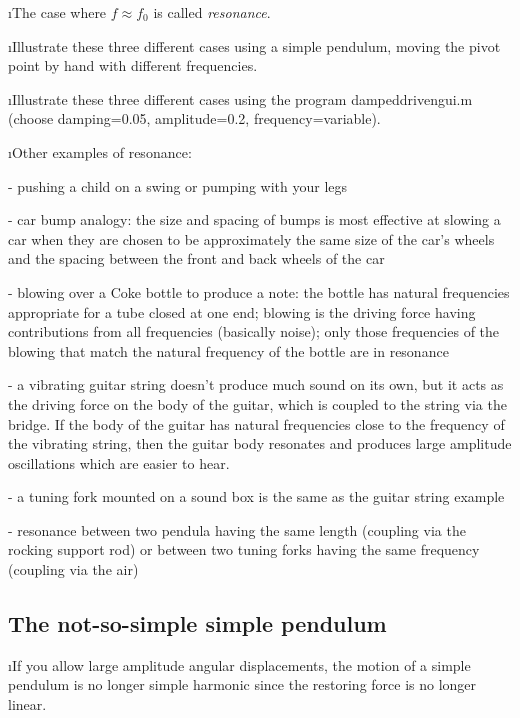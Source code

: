 \i The case where $f\approx f_0$ is called {\em resonance}.

\i \demo Illustrate these three different cases using
a simple pendulum, moving the pivot point by hand with 
different frequencies.

\i \demo Illustrate these three different cases using
the program dampeddrivengui.m
(choose damping=0.05, amplitude=0.2, frequency=variable).

\i Other examples of resonance:

- pushing a child on a swing or pumping with your legs 

- car bump analogy: the size and spacing of bumps is 
most effective at slowing a car when they are chosen 
to be approximately the same size of the car's wheels 
and the spacing between the front and back wheels of
the car

- blowing over a Coke bottle to produce a note:
the bottle has natural frequencies appropriate for 
a tube closed at one end;
blowing is the driving force having 
contributions from all frequencies (basically noise);
only those frequencies of the blowing that match 
the natural frequency of the bottle are in resonance

- a vibrating guitar string doesn't 
produce much sound on its own, but it acts as the 
driving force on the body of the guitar, which is 
coupled to the string via the bridge.
If the body of the guitar has natural frequencies 
close to the frequency of the 
vibrating string, then the guitar body resonates 
and produces large amplitude oscillations which are 
easier to hear.

- a tuning fork mounted on a sound box is the
same as the guitar string example

- resonance between two pendula having the same 
length (coupling via the rocking support rod) 
or between two tuning forks having 
the same frequency (coupling via the air)

\ei

\subsection{The not-so-simple simple pendulum}
\label{s:notsosimple}

\bi

\i If you allow large amplitude angular displacements,
the motion of a simple pendulum is no longer simple harmonic
since the restoring force is no longer linear.

